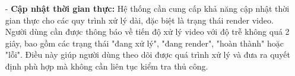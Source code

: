 \begin{itemize}
    
    \item[-] \textbf{Cập nhật thời gian thực:} Hệ thống cần cung cấp khả năng cập nhật thời gian thực cho các quy trình xử lý dài, đặc biệt là trạng thái render video. Người dùng cần được thông báo về tiến độ xử lý video với độ trễ không quá 2 giây, bao gồm các trạng thái "đang xử lý", "đang render", "hoàn thành" hoặc "lỗi". Điều này giúp người dùng theo dõi được quá trình xử lý và đưa ra quyết định phù hợp mà không cần liên tục kiểm tra thủ công.
    
\end{itemize}